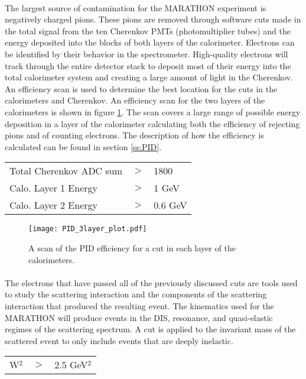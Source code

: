 \paragraph{}The largest source of contamination for the MARATHON experiment is negatively charged pions. These pions are removed through software cuts made in the total signal from the ten Cherenkov PMTs (photomultiplier tubes) and the energy deposited into the blocks of both layers of the calorimeter. Electrons can be identified by their behavior in the spectrometer. High-quality electrons will track through the entire detector stack to deposit most of their energy into the total calorimeter system and creating a large amount of light in the Cherenkov. An efficiency scan is used to determine the best location for the cuts in the calorimeters and Cherenkov. An efficiency scan for the two layers of the calorimeters is shown in figure \ref{cal_pidscan}. The scan covers a large range of possible energy deposition in a layer of the calorimeter calculating both the efficiency of rejecting pions and of counting electrons. The description of how the efficiency is calculated can be found in section \ref{ss:PID}.

\begin{tabular}{@{$\bullet$ }lll}
	Total Cherenkov ADC sum &$>$ &1800\\
	Calo. Layer 1 Energy &$>$ & 1 GeV\\
	Calo. Layer 2 Energy &$>$ & 0.6 GeV
\end{tabular}

\begin{figure}[t]
	\centering
	\texttt{[image: PID\_3layer\_plot.pdf]}
	\caption{ A scan of the PID efficiency for a cut in each layer of the calorimeters.}
	\label{cal_pidscan}
\end{figure}

\paragraph{}The electrons that have passed all of the previously discussed cuts are tools used to study the scattering interaction and the components of the scattering interaction that produced the resulting event. The kinematics used for the MARATHON will produce events in the DIS, resonance, and quasi-elastic regimes of the scattering spectrum. A cut is applied to the invariant mass of the scattered event to only include events that are deeply inelastic. 

\begin{tabular}{@{$\bullet$ }lll}
	W$^2$ &$>$ &2.5 GeV$^2$\\
\end{tabular}

